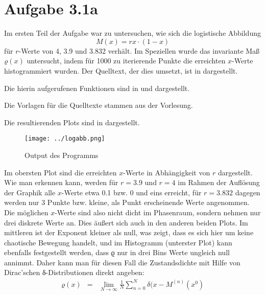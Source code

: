\section*{Aufgabe 3.1a}
Im ersten Teil der Aufgabe war zu untersuchen, wie sich die logistische
Abbildung $$M(x) = rx\cdot (1-x)$$ für $r$-Werte von 4, 3.9 und 3.832 verhält.
Im Speziellen wurde das invariante Maß $ϱ(x)$ untersucht, indem für 1000 zu
iterierende Punkte die erreichten $x$-Werte histogrammiert wurden. Der
Quelltext, der dies umsetzt, ist in  dargestellt.



Die hierin aufgerufenen Funktionen sind in  und 
dargestellt.





Die Vorlagen für die Quelltexte stammen aus der Vorlesung. 

Die resultierenden Plots sind in  dargestellt.
\begin{figure}[htb]
\centering
  \texttt{[image: ../logabb.png]}
  \caption{Output des Programms}
  \label{fig:logabb}
\end{figure}

Im obersten Plot sind die erreichten $x$-Werte in Abhängigkeit von $r$
dargestellt. Wie man erkennen kann, werden für $r=3.9$ und $r=4$ im Rahmen der
Auflösung der Graphik alle $x$-Werte etwa 0.1 bzw. 0 und eins erreicht, für
$r=3.832$ dagegen werden nur 3 Punkte bzw. kleine, als Punkt erscheinende Werte
angenommen. Die möglichen $x$-Werte sind also nicht dicht im Phasenraum,
sondern nehmen nur drei diskrete Werte an. Dies äußert sich auch in den
anderen beiden Plots. Im mittleren ist der Exponent kleiner als null, was
zeigt, dass es sich hier um keine chaotische Bewegung handelt, und im
Histogramm (unterster Plot) kann ebenfalls festgestellt werden, dass ϱ nur in
drei Bins Werte ungleich null annimmt. Daher kann man für diesen Fall die
Zustandsdichte mit Hilfe von Dirac’schen δ-Distributionen direkt angeben:
\begin{eqnarray}
ϱ(x) &=& \lim_{N\to\infty}\frac{1}{N}\sum_{n=0}^{N}δ(x - M^{(n)}(x^0)
\end{eqnarray}

